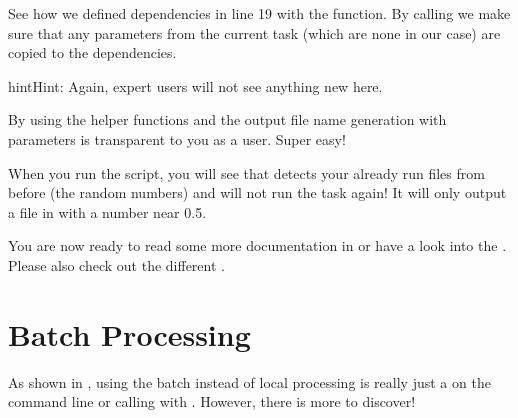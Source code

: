 \documentclass[letterpaper,10pt,english]{sphinxmanual}
\begin{document}
\begin{enumerate}
See how we defined dependencies in line 19 with the  function.
By calling  we make sure that any parameters from the current task (which are none in our case)
are copied to the dependencies.

\begin{sphinxadmonition}{hint}{Hint:}
Again, expert  users will not see anything new here.
\end{sphinxadmonition}

By using the helper functions {\hyperref[\detokenize{documentation/api:b2luigi.Task.get_input_file_names}]{}}
and  the output file name generation with parameters
is transparent to you as a user.
Super easy!

When you run the script, you will see that  detects your already run files
from before (the random numbers) and will not run the task again!
It will only output a file in  with a number near 0.5.

\end{enumerate}

You are now ready to read some more documentation in {\hyperref[\detokenize{documentation/api:api-documentation-label}]{}} or have a look into the {\hyperref[\detokenize{advanced/faq:faq-label}]{}}.
Please also check out the different {\hyperref[\detokenize{documentation/run_modes:run-modes-label}]{}}.


\section{Batch Processing}
\label{\detokenize{usage/batch:batch-processing}}\label{\detokenize{usage/batch:batch-label}}\label{\detokenize{usage/batch::doc}}
As shown in {\hyperref[\detokenize{usage/quickstart:quick-start-label}]{}}, using the batch instead of local processing is really just a 
on the command line or calling  with .
However, there is more to discover!
\end{document}
